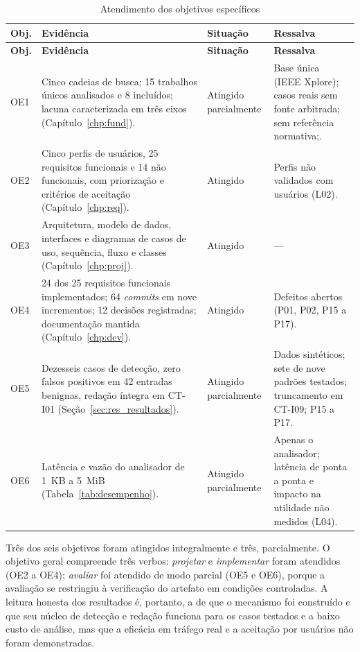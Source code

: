 {\small
\begin{longtable}{|p{1.1cm}|p{8.1cm}|p{2.6cm}|p{2.5cm}|}
\caption{Atendimento dos objetivos específicos}\label{tab:objetivos}\\
\hline
\textbf{Obj.} & \textbf{Evidência} & \textbf{Situação} & \textbf{Ressalva} \\ \hline
\endfirsthead
\hline
\textbf{Obj.} & \textbf{Evidência} & \textbf{Situação} & \textbf{Ressalva} \\ \hline
\endhead
OE1 & Cinco cadeias de busca; 15 trabalhos únicos analisados e 8 incluídos; lacuna caracterizada em três eixos (Capítulo~\ref{chp:fund}). & Atingido parcialmente & Base única (IEEE Xplore); casos reais sem fonte arbitrada; sem referência normativa;. \\ \hline
OE2 & Cinco perfis de usuários, 25 requisitos funcionais e 14 não funcionais, com priorização e critérios de aceitação (Capítulo~\ref{chp:req}). & Atingido & Perfis não validados com usuários (L02). \\ \hline
OE3 & Arquitetura, modelo de dados, interfaces e diagramas de casos de uso, sequência, fluxo e classes (Capítulo~\ref{chp:proj}). & Atingido & --- \\ \hline
OE4 & 24 dos 25 requisitos funcionais implementados; 64 \textit{commits} em nove incrementos; 12 decisões registradas; documentação mantida (Capítulo~\ref{chp:dev}). & Atingido & Defeitos abertos (P01, P02, P15 a P17). \\ \hline
OE5 & Dezesseis casos de detecção, zero falsos positivos em 42 entradas benignas, redação íntegra em CT-I01 (Seção~\ref{sec:res_resultados}). & Atingido parcialmente & Dados sintéticos; sete de nove padrões testados; truncamento em CT-I09; P15 a P17. \\ \hline
OE6 & Latência e vazão do analisador de 1~KB a 5~MiB (Tabela~\ref{tab:desempenho}). & Atingido parcialmente & Apenas o analisador; latência de ponta a ponta e impacto na utilidade não medidos (L04). \\ \hline
\end{longtable}
}
\noindent{}

Três dos seis objetivos foram atingidos integralmente e três, parcialmente. O objetivo geral compreende três verbos: \textit{projetar} e \textit{implementar} foram atendidos (OE2 a OE4); \textit{avaliar} foi atendido de modo parcial (OE5 e OE6), porque a avaliação se restringiu à verificação do artefato em condições controladas. A leitura honesta dos resultados é, portanto, a de que o mecanismo foi construído e que seu núcleo de detecção e redação funciona para os casos testados e a baixo custo de análise, mas que a eficácia em tráfego real e a aceitação por usuários não foram demonstradas.

